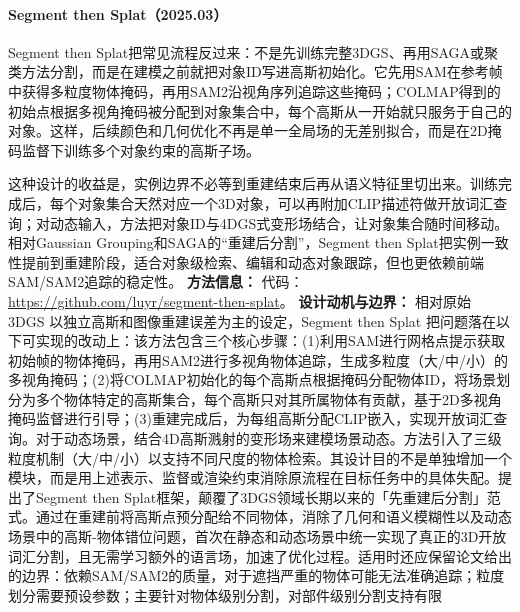 \paragraph{Segment then Splat（2025.03）\cite{2503_22204}}
Segment then Splat把常见流程反过来：不是先训练完整3DGS、再用SAGA或聚类方法分割，而是在建模之前就把对象ID写进高斯初始化。它先用SAM在参考帧中获得多粒度物体掩码，再用SAM2沿视角序列追踪这些掩码；COLMAP得到的初始点根据多视角掩码被分配到对象集合中，每个高斯从一开始就只服务于自己的对象。这样，后续颜色和几何优化不再是单一全局场的无差别拟合，而是在2D掩码监督下训练多个对象约束的高斯子场。

这种设计的收益是，实例边界不必等到重建结束后再从语义特征里切出来。训练完成后，每个对象集合天然对应一个3D对象，可以再附加CLIP描述符做开放词汇查询；对动态输入，方法把对象ID与4DGS式变形场结合，让对象集合随时间移动。相对Gaussian Grouping和SAGA的“重建后分割”，Segment then Splat把实例一致性提前到重建阶段，适合对象级检索、编辑和动态对象跟踪，但也更依赖前端SAM/SAM2追踪的稳定性。
\textbf{方法信息：} 代码：\url{https://github.com/luyr/segment-then-splat}。
\textbf{设计动机与边界：} 相对原始 3DGS 以独立高斯和图像重建误差为主的设定，Segment then Splat 把问题落在以下可实现的改动上：该方法包含三个核心步骤：(1)利用SAM进行网格点提示获取初始帧的物体掩码，再用SAM2进行多视角物体追踪，生成多粒度（大/中/小）的多视角掩码；(2)将COLMAP初始化的每个高斯点根据掩码分配物体ID，将场景划分为多个物体特定的高斯集合，每个高斯只对其所属物体有贡献，基于2D多视角掩码监督进行引导；(3)重建完成后，为每组高斯分配CLIP嵌入，实现开放词汇查询。对于动态场景，结合4D高斯溅射的变形场来建模场景动态。方法引入了三级粒度机制（大/中/小）以支持不同尺度的物体检索。其设计目的不是单独增加一个模块，而是用上述表示、监督或渲染约束消除原流程在目标任务中的具体失配。提出了Segment then Splat框架，颠覆了3DGS领域长期以来的「先重建后分割」范式。通过在重建前将高斯点预分配给不同物体，消除了几何和语义模糊性以及动态场景中的高斯-物体错位问题，首次在静态和动态场景中统一实现了真正的3D开放词汇分割，且无需学习额外的语言场，加速了优化过程。适用时还应保留论文给出的边界：依赖SAM/SAM2的质量，对于遮挡严重的物体可能无法准确追踪；粒度划分需要预设参数；主要针对物体级别分割，对部件级别分割支持有限
